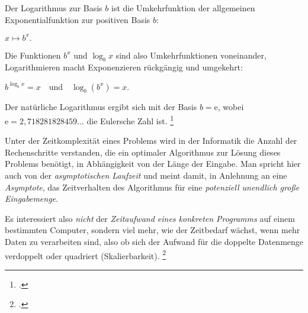 \documentclass{lehramt-informatik-haupt}
\begin{document}
\begin{liExkurs}[Logarithmus]
Der Logarithmus zur Basis $b$ ist die Umkehrfunktion der allgemeinen
Exponentialfunktion zur positiven Basis $b$:

$x \mapsto b^x.$

Die Funktionen $b^x$ und $\log_b x$ sind also Umkehrfunktionen
voneinander, \dh Logarithmieren macht Exponenzieren rückgängig und
umgekehrt:

$b^{\log_b x} = x \quad \text{und} \quad \log_b(b^x) = x.$

Der natürliche Logarithmus ergibt sich mit der Basis $b=\mathrm{e}$,
wobei $\mathrm{e} = 2{,}718281828459\ldots$ die Eulersche Zahl ist.
\footcite[Definition / Als Umkehrfunktion der Exponentialfunktion]{wiki:logarithmus}
\end{liExkurs}
\begin{liExkurs}%
Unter der Zeitkomplexität eines Problems wird in der Informatik die
Anzahl der Rechenschritte verstanden, die ein optimaler Algorithmus zur
Lösung dieses Problems benötigt, in Abhängigkeit von der Länge der
Eingabe. Man spricht hier auch von der \emph{asymptotischen Laufzeit}
und meint damit, in Anlehnung an eine \emph{Asymptote}, das
Zeitverhalten des Algorithmus für eine \emph{potenziell unendlich große
Eingabemenge}.

Es interessiert also \emph{nicht} der \emph{Zeitaufwand eines konkreten
Programms} auf einem bestimmten Computer, sondern viel mehr, wie der
Zeitbedarf wächst, wenn mehr Daten zu verarbeiten sind, also \zB ob
sich der Aufwand für die doppelte Datenmenge verdoppelt oder quadriert
(Skalierbarkeit).
\footcite{wiki:zeitkomplexitaet}
\end{liExkurs}

\literatur
\end{document}
